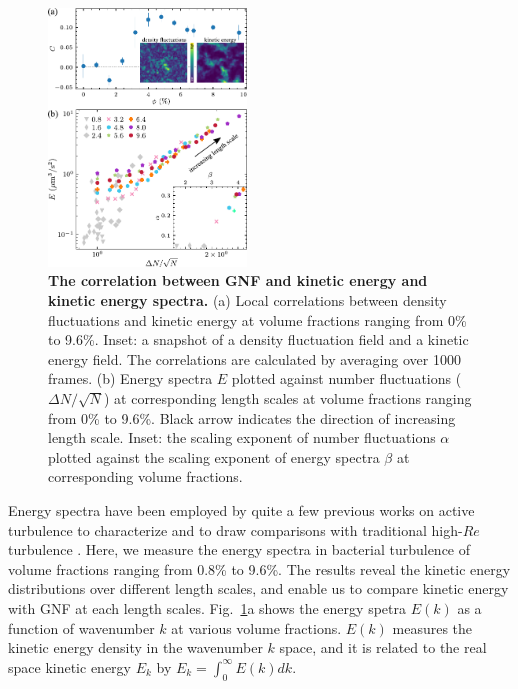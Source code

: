 \documentclass[twocolumn,aps,prl,amsmath,amssymb,longbibliography]{revtex4-2}
\begin{document}
\begin{figure}[!]
\begin{center}
\includegraphics[width=0.47\textwidth]{figures/GNF-energy-spectra-correlation/v1.pdf}
\caption[Energy spectrum and its correlation with GNF]
{
\textbf{The correlation between GNF and kinetic energy and kinetic energy spectra.}
(a) Local correlations between density fluctuations and kinetic energy at volume fractions ranging from 0\% to 9.6\%. Inset: a snapshot of a density fluctuation field and a kinetic energy field. The correlations are calculated by averaging over 1000 frames.
(b) Energy spectra $E$ plotted against number fluctuations ($\Delta N/\sqrt N$) at corresponding length scales at volume fractions ranging from 0\% to 9.6\%. Black arrow indicates the direction of increasing length scale. Inset: the scaling exponent of number fluctuations $\alpha$ plotted against the scaling exponent of energy spectra $\beta$ at corresponding volume fractions.
}
\label{fig:GNF-energy-spectra-correlation}
\end{center}
\end{figure}
Energy spectra have been employed by quite a few previous works on active turbulence to characterize and to draw comparisons with traditional high-$Re$ turbulence
\cite{Ishikawa2011, Wensink2012, Dunkel2013b, Bratanov2015, Chatterjee2019, Karani2019,
 Skultety2020, Peng2020}. Here,
we measure the energy spectra in bacterial turbulence of volume fractions ranging from 0.8\% to 9.6\%.
The results reveal the kinetic energy distributions over different length scales, and enable us to compare kinetic energy with GNF at each length scales.
Fig.~\ref{fig:GNF-energy-spectra-correlation}a shows the energy spetra $E(k)$ as a function of wavenumber $k$ at various volume fractions.
$E(k)$ measures the kinetic energy density in the wavenumber $k$ space, and it is related to the real space kinetic energy $E_k$ by $E_k = \int_0^\infty E(k)dk$.
\end{document}
